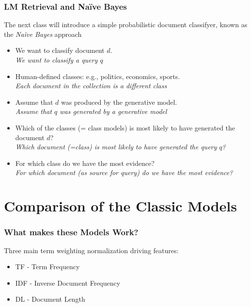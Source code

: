 \documentclass[svgnames]{beamer}
\begin{document}
\begin{frame} \frametitle{LM Retrieval and Na{\"i}ve Bayes}
    
    \begin{block}{}
    The next class will introduce a simple probabilistic document classifyer, known as the \emph{Na{\"i}ve Bayes} approach
    \end{block}
  
    \scriptsize
    \begin{itemize}
    \item We want to classify document $d$. \\ \emph{We want to classify a query $q$}
	\item Human-defined classes: e.g., politics, economics, sports. \\ \emph{Each document in the collection is a different class}
	\item Assume that $d$ was produced by the generative model. \\ \emph{Assume that $q$ was generated by a generative model}
    \item Which of the classes (= class models) is most likely to have generated the document $d$? \\ \emph{Which document (=class) is most likely to have generated the query $q$?}
    \item For which class do we have the most evidence? \\ \emph{For which document (as source for query) do we have the most evidence?}
	\end{itemize}

\end{frame}



\section{Comparison of the Classic Models}
\label{sec:comparison}

\begin{frame}  \frametitle{What makes these Models Work?}

\begin{block}{Three main term weighting normalization driving features:}
\begin{itemize}
\item TF - Term Frequency
\item IDF - Inverse Document Frequency
\item DL - Document Length
\end{itemize}
\end{block}
\end{frame}
\end{document}
